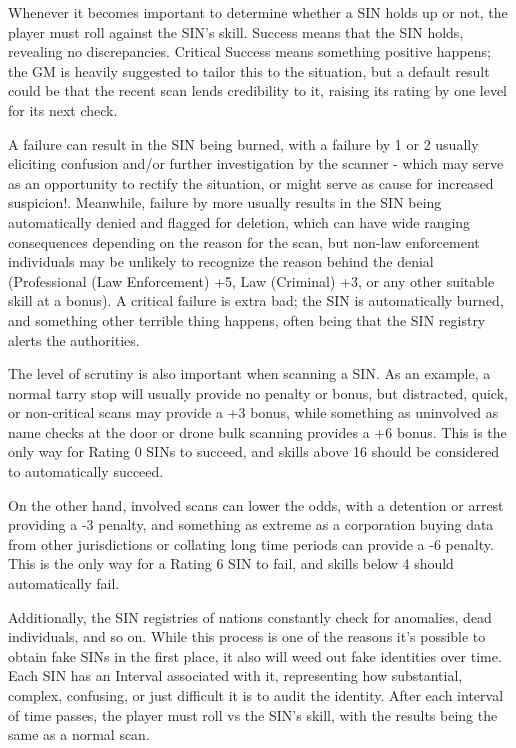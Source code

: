 Whenever it becomes important to determine whether a SIN holds up or not, the player must roll against the SIN's skill. Success means that the SIN holds, revealing no discrepancies. Critical Success means something positive happens; the GM is heavily suggested to tailor this to the situation, but a default result could be that the recent scan lends credibility to it, raising its rating by one level for its next check. 

A failure can result in the SIN being burned, with a failure by 1 or 2 usually eliciting confusion and/or further investigation by the scanner - which may serve as an opportunity to rectify the situation, or might serve as cause for increased suspicion!. Meanwhile, failure by more usually results in the SIN being automatically denied and flagged for deletion, which can have wide ranging consequences depending on the reason for the scan, but non-law enforcement individuals may be unlikely to recognize the reason behind the denial (Professional (Law Enforcement) +5, Law (Criminal) +3, or any other suitable skill at a bonus). A critical failure is extra bad; the SIN is automatically burned, and something other terrible thing happens, often being that the SIN registry alerts the authorities.

The level of scrutiny is also important when scanning a SIN. As an example, a normal tarry stop will usually provide no penalty or bonus, but distracted, quick, or non-critical scans may provide a +3 bonus, while something as uninvolved as name checks at the door or drone bulk scanning provides a +6 bonus. This is the only way for Rating 0 SINs to succeed, and skills above 16 should be considered to automatically succeed. 

On the other hand, involved scans can lower the odds, with a detention or arrest providing a -3 penalty, and something as extreme as a corporation buying data from other jurisdictions or collating long time periods can provide a -6 penalty. This is the only way for a Rating 6 SIN to fail, and skills below 4 should automatically fail.

Additionally, the SIN registries of nations constantly check for anomalies, dead individuals, and so on. While this process is one of the reasons it's possible to obtain fake SINs in the first place, it also will weed out fake identities over time. Each SIN has an Interval associated with it, representing how substantial, complex, confusing, or just difficult it is to audit the identity. After each interval of time passes, the player must roll vs the SIN's skill, with the results being the same as a normal scan.

